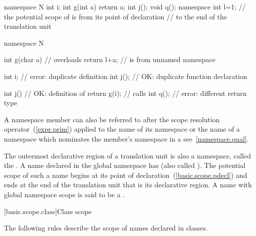 \begin{codeblock}
namespace N {
  int i;
  int g(int a) { return a; }
  int j();
  void q();
}
namespace { int l=1; }
// the potential scope of  is from its point of declaration
// to the end of the translation unit

namespace N {
  int g(char a) {   // overloads 
    return l+a;     //  is from unnamed namespace
  }

  int i;            // error: duplicate definition
  int j();          // OK: duplicate function declaration

  int j() {         // OK: definition of 
    return g(i);    // calls 
  }
  int q();          // error: different return type
}
\end{codeblock}
\exitexample 

\pnum
A namespace member can also be referred to after the \tcode{::} scope
resolution operator~(\ref{expr.prim}) applied to the name of its
namespace or the name of a namespace which nominates the member's
namespace in a  see~\ref{namespace.qual}.

\pnum
{}%
%
The outermost declarative region of a translation unit is also a
namespace, called the . A name declared in
the global namespace has  (also called
). The potential scope of such a name begins at
its point of declaration~(\ref{basic.scope.pdecl}) and ends at the end
of the translation unit that is its declarative region.
%
A name with global namespace scope is said to be a
.

[basic.scope.class]{Class scope}

\pnum
{}%
The following rules describe the scope of names declared in classes.

